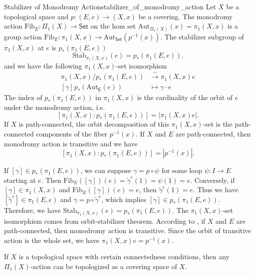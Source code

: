 \documentclass{report}
\begin{document}
\begin{proposition}{Stabilizer of Monodromy Action}{stabilizer_of_monodromy_action}
	Let $X$ be a topological space and $p:(E,e)\to (X,x)$ be a covering. The monodromy action $\mathrm{Fib}_E:\Pi_1(X)\to \mathsf{Set}$ on the hom set $\mathrm{Aut}_{\Pi_1(X)}(x)=\pi_1(X, x)$ is a group action $\mathrm{Fib}_E:\pi_1(X, x)\to \mathrm{Aut}_{\mathsf{Set}}(p^{-1}(x))$. The stabilizer subgroup of $\pi_1(X, x)$ at $e$ is $p_*(\pi_1(E, e))$
	\[
		\mathrm{Stab}_{\pi_1(X, x)}(e)=p_*(\pi_1(E, e)).
	\]
	and we have the following $\pi_1(X, x)$-set isomorphism
	\begin{align*}
		\pi_1(X, x)/p_*\left(\pi_1(E, e)\right)               & \stackrel{\sim}{\longrightarrow} \pi_1(X, x)e \\
		[\gamma]\hspace{1pt}p_*(\mathrm{Aut}_{\mathsf{E}}(e)) & \longmapsto \gamma\cdot e
	\end{align*}
	The index of $p_*(\pi_1(E, e))$ in $\pi_1(X, x)$ is the cardinality of the orbit of $e$ under the monodromy action, i.e.
	\[
		\left[ \pi_1(X, x):p_*(\pi_1(E, e))\right]=\left|\pi_1(X, x)e\right|.
	\]
	If $X$ is path-connected, the orbit decomposition of this $\pi_1(X, x)$-set is the path-connected components of the fiber $p^{-1}(x)$. If $X$ and $E$ are path-connected, then monodromy action is transitive and we have
	\[
		\left[ \pi_1(X, x):p_*(\pi_1(E, e))\right]=\left|p^{-1}(x)\right|.
	\]
\end{proposition}

\begin{prf}
	If $[\gamma]\in p_*(\pi_1(E, e))$, we can suppose $\gamma=p\circ \psi$ for some loop $\psi:I\to E$ starting at $e$. Then $\mathrm{Fib}_E([\gamma])(e) = \widetilde{\gamma}^{e}(1)=\psi(1)=e$. Conversely, if $[\gamma]\in\pi_1(X,x)$ and $\mathrm{Fib}_E([\gamma])(e)=e$, then $\widetilde{\gamma}^{e}(1)=e$. Thus we have $\left[\widetilde{\gamma}^{e}\right]\in \pi_1(E,e)$ and  $\gamma=p\circ \widetilde{\gamma}^{e}$, which implies $[\gamma]\in p_*(\pi_1(E, e))$. Therefore, we have $\mathrm{Stab}_{\pi_1(X, x)}(e)=p_*(\pi_1(E, e))$. The $\pi_1(X, x)$-set isomorphism comes from orbit-stabilizer theorem. According to , if $X$ and $E$ are path-connected, then monodromy action is transitive. Since the orbit of transitive action is the whole set, we have $\pi_1(X, x)e=p^{-1}(x)$.
\end{prf}




If $X$ is a topological space with certain connectedness conditions, then any $\Pi_1(X)$-action can be topologized as a covering space of $X$.
\end{document}
